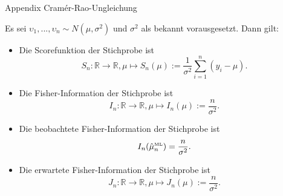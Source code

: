\documentclass[
  8pt,
  ignorenonframetext,
]{beamer}
\newcommand{\ups} {\upsilon}
\begin{document}
\begin{frame}{Appendix \textbar{} Cramér-Rao-Ungleichung}
\protect\hypertarget{appendix-cramuxe9r-rao-ungleichung-11}{}
\footnotesize
\begin{theorem}
\justifying
\normalfont
Es sei $\ups_1,...,\ups_n \sim N(\mu,\sigma^2)$ und $\sigma^2$ als bekannt vorausgesetzt. Dann gilt:
\vspace{1mm}
\begin{itemize}
\item Die Scorefunktion der Stichprobe ist
\begin{equation}
S_n : \mathbb{R} \to \mathbb{R}, \mu \mapsto S_n(\mu) := \frac{1}{\sigma^2}\sum_{i=1}^n(y_i-\mu).
\end{equation}
\item Die Fisher-Information der Stichprobe ist
\begin{equation}
I_n : \mathbb{R} \to \mathbb{R}, \mu \mapsto I_n(\mu) := \frac{n}{\sigma^2}.
\end{equation}
\item Die beobachtete Fisher-Information der Stichprobe ist
\begin{equation}
I_n(\hat{\mu}^{\mbox{\tiny ML}}_n) = \frac{n}{\sigma^2}.
\end{equation}
\item Die erwartete Fisher-Information der Stichprobe ist
\begin{equation}
J_n : \mathbb{R} \to \mathbb{R}, \mu \mapsto J_n(\mu) := \frac{n}{\sigma^2}.
\end{equation}
\end{itemize}
\end{theorem}
\end{frame}
\end{document}
